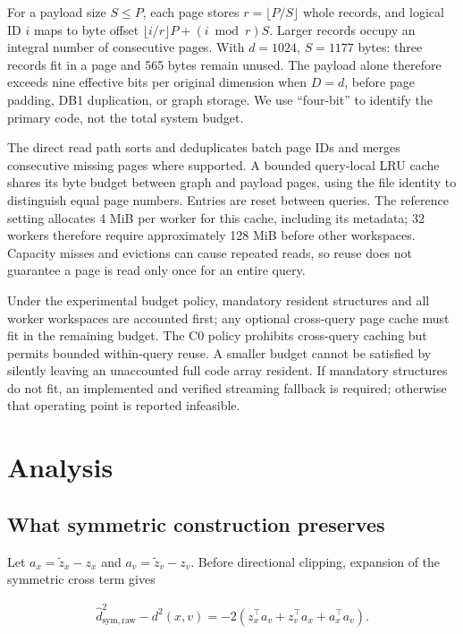 For a payload size $S\leq P$, each page stores $r=\lfloor P/S\rfloor$ whole records, and logical ID $i$ maps to byte offset $\lfloor i/r\rfloor P+(i\bmod r)S$. Larger records occupy an integral number of consecutive pages. With $d=1024$, $S=1177$ bytes: three records fit in a page and 565 bytes remain unused. The payload alone therefore exceeds nine effective bits per original dimension when $D=d$, before page padding, DB1 duplication, or graph storage. We use ``four-bit'' to identify the primary code, not the total system budget.

The direct read path sorts and deduplicates batch page IDs and merges consecutive missing pages where supported. A bounded query-local LRU cache shares its byte budget between graph and payload pages, using the file identity to distinguish equal page numbers. Entries are reset between queries. The reference setting allocates 4 MiB per worker for this cache, including its metadata; 32 workers therefore require approximately 128 MiB before other workspaces. Capacity misses and evictions can cause repeated reads, so reuse does not guarantee a page is read only once for an entire query.

Under the experimental budget policy, mandatory resident structures and all worker workspaces are accounted first; any optional cross-query page cache must fit in the remaining budget. The C0 policy prohibits cross-query caching but permits bounded within-query reuse. A smaller budget cannot be satisfied by silently leaving an unaccounted full code array resident. If mandatory structures do not fit, an implemented and verified streaming fallback is required; otherwise that operating point is reported infeasible.

\section{Analysis}

\subsection{What symmetric construction preserves}

Let $a_x=\widetilde z_x-z_x$ and $a_v=\widetilde z_v-z_v$. Before directional clipping, expansion of the symmetric cross term gives

\begin{equation}
\begin{gathered}
\widehat d_{\mathrm{sym,raw}}^2-d^2(x,v)
=-2(z_x^\top a_v+z_v^\top a_x+a_x^\top a_v).
\end{gathered}
\end{equation}

